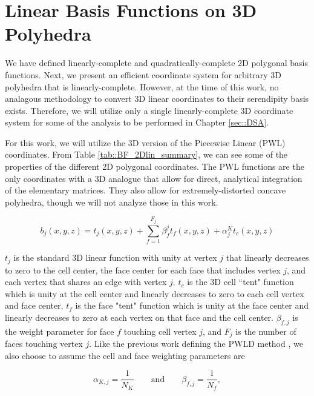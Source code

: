 \section{Linear Basis Functions on 3D Polyhedra}
\label{sec::BF_3DLinear}


We have defined linearly-complete and quadratically-complete 2D polygonal basis functions. Next, we present an efficient coordinate system for arbitrary 3D polyhedra that is linearly-complete. However, at the time of this work, no analagous methodology to convert 3D linear coordinates to their serendipity basis exists. Therefore, we will utilize only a single linearly-complete 3D coordinate system for some of the analysis to be performed in Chapter \ref{sec::DSA}.

For this work, we will utilize the 3D version of the Piecewise Linear (PWL) coordinates. From Table \ref{tab::BF_2Dlin_summary}, we can see some of the properties of the different 2D polygonal coordinates. The PWL functions are the only coordinates with a 3D analogue that allow for direct, analytical integration of the elementary matrices. They also allow for extremely-distorted concave polyhedra, though we will not analyze those in this work. 

\begin{equation}
\label{eq::PWL_3D}
	b_j (x,y,z)  = t_j  (x,y,z) + \sum_{f=1}^{F_j} \beta_f^j  t_f (x,y,z) + \alpha_j^K t_c  (x,y,z)
\end{equation}

\noindent $t_j$ is the standard 3D linear function with unity at vertex $j$ that linearly decreases to zero to the cell center, the face center for each face that includes vertex $j$, and each vertex that shares an edge with vertex $j$. $t_c$ is the 3D cell ``tent" function which is unity at the cell center and linearly decreases to zero to each cell vertex and face center. $t_f$ is the face "tent" function which is unity at the face center and linearly decreases to zero at each vertex on that face and the cell center. $\beta_{f,j}$ is the weight parameter for face $f$ touching cell vertex $j$, and $F_j$ is the number of faces touching vertex $j$. Like the previous work defining the PWLD method \cite{bailey2008phd}, we also choose to assume the cell and face weighting parameters are

\begin{equation}
\alpha_{K,j} = \frac{1}{N_K} \qquad \text{and} \qquad \beta_{f,j} = \frac{1}{N_f},
\label{eq::PWL_weight_vals}
\end{equation}

